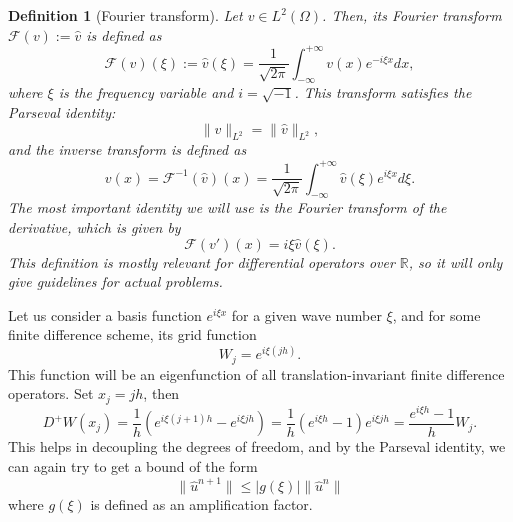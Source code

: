 \documentclass{article}
\newtheorem{definition}{Definition}
\newcommand{\R}{\mathbb{R}}
\begin{document}
\begin{definition}[Fourier transform]
    Let $v\in L^2(\Omega)$. Then, its Fourier transform $\mathcal{F}(v) := \hat{v}$ is defined as
    $$ \mathcal{F}(v)(\xi) := \hat{v}(\xi) = \frac{1}{\sqrt{2\pi}}\int_{-\infty}^{+\infty} v(x)e^{-i\xi x}dx, $$
    where $\xi$ is the frequency variable and $i=\sqrt{-1}$. This transform satisfies the Parseval identity:
    $$ \| v\|_{L^2} = \| \hat{v}\|_{L^2}, $$
    and the inverse transform is defined as
    $$ v(x) = \mathcal{F}^{-1}(\hat{v})(x) = \frac{1}{\sqrt{2\pi}}\int_{-\infty}^{+\infty} \hat{v}(\xi)e^{i\xi x}d\xi. $$
    The most important identity we will use is the Fourier transform of the derivative, which is given by
    $$ \mathcal{F}(v')(x) = i\xi \hat{v}(\xi). $$
    This definition is mostly relevant for differential operators over $\R$, so it will only give guidelines for actual problems.
\end{definition}
Let us consider a basis function $e^{i\xi x}$ for a given wave number $\xi$, and for some finite difference scheme, its grid function
$$W_j = e^{i\xi (jh)}.$$
This function will be an eigenfunction of all translation-invariant finite difference operators. Set $x_j = jh$, then
$$D^+ W(x_j) = \frac{1}{h}\left(e^{i\xi (j+1)h} - e^{i\xi j h}\right) = \frac{1}{h}\left(e^{i\xi h} - 1\right)e^{i\xi j h} = \frac{e^{i\xi h} - 1}{h}W_j.$$
This helps in decoupling the degrees of freedom, and by the Parseval identity, we can again try to get a bound of the form
$$\|\hat{u}^{n+1}\|\leq |g(\xi)| \|\hat{u}^{n}\|$$
where $g(\xi)$ is defined as an amplification factor. 
\end{document}
